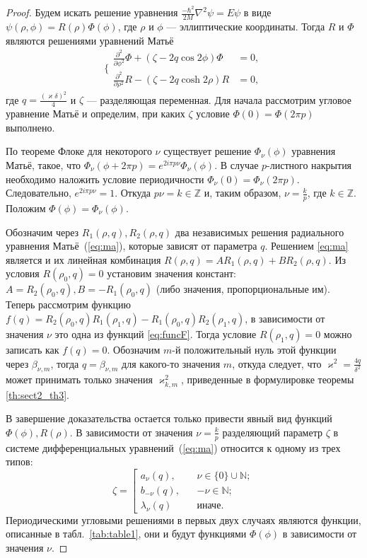 \begin{proof}

Будем искать решение уравнения $\frac{-\hbar^2}{2M} \nabla^2\psi = E\psi$  в виде  $\psi(\rho, \phi)=R(\rho)\Phi(\phi)$, где  $\rho$ и $\phi$ --- эллиптические координаты.
Тогда $R$ и $\Phi$ являются решениями уравнений Матьё
\begin{equation}
	\Bigg\{
	\begin{array}{ccc}
		\frac{\partial^2}{\partial \phi^2}\Phi + (\zeta - 2q\cos{2\phi})\Phi & = 0, \\
		\frac{\partial^2}{\partial \rho^2}R - (\zeta - 2q\cosh{2\rho})R &= 0,
	\end{array}
\label{eq:ma}
\end{equation}
где
$q=\frac{(\varkappa \delta)^2}{4}$ и 
$\zeta$ --- разделяющая переменная. Для начала рассмотрим угловое уравнение Матьё и определим, при каких $\zeta$ условие $\Phi(0)=\Phi(2\pi p)$ выполнено.

По теореме Флоке для некоторого $\nu$ существует решение $\Phi_\nu(\phi)$ уравнения Матьё, такое, что $\Phi_\nu(\phi+2\pi p) =e^{2 i \pi p \nu}\Phi_\nu(\phi)$. В случае $p$-листного накрытия необходимо наложить условие периодичности $\Phi_\nu(0) = \Phi_\nu(2 \pi p)$. Следовательно, $e^{2 i \pi p \nu} = 1$. Откуда $ p \nu = k \in \mathbb{Z}$ и, таким образом, $ \nu = \frac{k}{p}$, где $k \in \mathbb{Z}$. 
Положим $\Phi(\phi) = \Phi_\nu(\phi)$.

Обозначим через $R_1(\rho, q), R_2(\rho, q)$ два независимых решения радиального уравнения Матьё~(\ref{eq:ma}), которые зависят от параметра $q$. Решением \eqref{eq:ma} является и их линейная комбинация $R(\rho, q) = A R_1(\rho, q) + B R_2(\rho, q)$. Из условия $R(\rho_0, q)=0$ установим значения констант: $A=R_2(\rho_0, q), B=-R_1(\rho_0, q)$ (либо значения, пропорциональные им). 
Теперь рассмотрим функцию $f(q) = R_2(\rho_0, q) R_1(\rho_1, q) -R_1(\rho_0, q) R_2(\rho_1, q)$, в зависимости от значения $\nu$ это одна из функций \eqref{eq:funcF}. Тогда условие $R(\rho_1, q)=0$ можно записать как $f(q)=0$. Обозначим $m$-й положительный нуль этой функции через $\beta_{\nu, m}$, тогда $q=\beta_{\nu, m}$ для какого-то значения $m$, откуда следует, что $\varkappa^2 = \frac{4q}{\delta^2}$ может принимать только значения $\varkappa^2_{k,m}$, приведенные в формулировке теоремы \ref{th:sect2_th3}.

В завершение доказательства остается только привести явный вид функций $\Phi(\phi), R(\rho)$. В зависимости от значения $\nu=\frac{k}{p}$ разделяющий параметр $\zeta$ в системе дифференциальных уравнений~(\ref{eq:ma}) относится к одному из трех типов:
\[
\zeta = \left[
\begin{array}{ll}
	a_\nu(q), 					& \nu \in \{0\} \cup \mathbb{N}; \\
    b_{-\nu}(q), 	\ \ \ \			& -\nu \in \mathbb{N}; \\
	\lambda_\nu(q) 	        & \text{иначе}.
\end{array}
\right.
\]
Периодическими угловыми решениями в первых двух случаях являются функции, описанные в табл.~\ref{tab:table1}, они и будут функциями $\Phi(\phi)$ в зависимости от значения $\nu$.


\end{proof}
